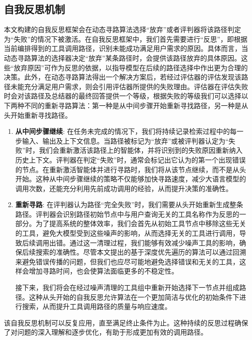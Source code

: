 \subsection{自我反思机制}

本文构建的自我反思框架会在动态寻路算法选择“放弃”或者评判器将该路径判定为“失败”的情况下被激活。在自我反思框架中，我们首先需要进行“反思”，即根据当前编排得到的工具调用路径，识别未能成功满足用户需求的原因。具体而言，当动态寻路算法的选择器决定“放弃”某条路径时，会提供该路径放弃的具体原因。这些“放弃原因”可作为反思的依据，以指导模型在后续的路径选择中作出更为合理的决策。此外，在动态寻路算法得出一个解决方案后，若经过评估器的评估发现该路径未能充分满足用户需求，则会引用评估器所提供的失败理由。评估器在评估失败时会对该路径及总结器的最终回答提供一个等级，根据失败的等级我们可以选择以下两种不同的重新寻路算法：第一种是从中间步骤开始重新寻找路径，另一种是从头开始重新寻找路径。

\begin{enumerate}
  \item \textbf{从中间步骤继续}: 在任务未完成的情况下，我们将持续记录检索过程中的每一步输入、输出及上下文信息。当路径被标记为“放弃”或被评判器认定为“失败”时，我们会重新激活该路径上的智能体，并将识别到的失败原因重新纳入历史上下文。评判器在判定“失败”时，通常会标记出它认为的第一个出现错误的节点。在重新激活智能体并进行寻路时，我们将从该节点继续，而不是从头开始。这种从中间步骤继续的策略不仅能够加快寻路速度，减少大语言模型的调用次数，还能充分利用先前成功调用的经验，从而提升决策的准确性。
  \item \textbf{重新寻路}: 在评判器认为路径“完全失败”时，我们需要从头开始重新生成整条路径。评判器会识别路径初始节点中与用户查询无关的工具名称作为反思的一部分。为了提高系统的整体效率，我们会首先从初始工具节点中移除这些无关的工具，避免大模型受到这些噪声的影响，从而选择无关的工具进行调用，导致后续调用出错。通过这一清理过程，我们能够有效减少噪声工具的影响，确保后续搜索的准确性。尽管本文提出的基于深度优先遍历的算法可以通过回溯来避免错误传播的问题，但我们也应尽可能地避免选择错误和无关的工具，这样会增加寻路时间，也会使算法面临更多的不稳定性。\par
  接下来，我们将会在经过噪声清理的工具组中重新开始选择下一节点并组成路径。这种从头开始的自我反思允许算法在一个更加简洁与优化的初始条件下进行搜索，从而提升工具调用路径的质量与响应速度。
\end{enumerate}
 
该自我反思机制可以反复应用，直至满足终止条件为止。这种持续的反思过程确保了对问题的深入理解和逐步优化，有助于形成更加有效的调用路径。

